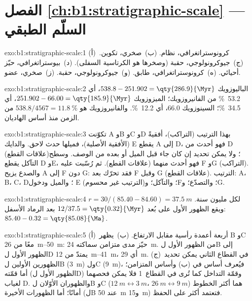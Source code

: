 \section*{الفصل \ref{ch:b1:stratigraphic-scale} --- السلّم الطبقي}

\begin{solution}{exo:b1:stratigraphic-scale:1}
(أ)~كرونوستراتغرافي، نظام. (ب)~صخري، تكوين.
(ج)~جيوكرونولوجي، حقبة (وصخرها هو  الكرتاسية السفلى).
(د)~بيوستراتغرافي، حيّز أحيائي. (ه)~كرونوستراتغرافي، طابق.
(و)~جيوكرونولوجي، حقبة. (ز)~صخري، عضو.
\end{solution}

\begin{solution}{exo:b1:stratigraphic-scale:2}
الباليوزويك $538.8 - 251.902 = \qty{286.9}{\Myr}$، أي \qty{53.2}{\%} من الفانيروزويك؛ الميزوزويك $251.902 - 66.00 = \qty{185.9}{\Myr}$، أي \qty{34.5}{\%}؛ السينوزويك \qty{66.0}{\Myr}، أي \qty{12.2}{\%}. والفانيروزويك هو $538.8/4567 = \qty{11.8}{\%}$ من الزمن منذ أساس الهاديان.
\end{solution}

\begin{solution}{exo:b1:stratigraphic-scale:3}
تكوّنت A وB وC وD بهذا الترتيب (التراكب)، أفقيةً (الأفقية الأصلية)، فميلها حدث لاحق. والدايك E يقطع A إلى D، فهو أحدث من D (علاقات القطع)؛ ولا يمكن تحديد إن كان جاء قبل الميل أو بعده من الوصف. وسطح التآكل يقطع D وE، فهو أحدث منهما (علاقات القطع). ثم رُسّبت عليه F وG (التراكب). والصدع يزيح A إلى F دون G: فقد تحرّك بعد F وقبل G (علاقات القطع). الترتيب: A، B، C، D؛ والميل ودخول E (الترتيب غير محسوم)؛ والتآكل؛ وF؛ والتصدّع؛ وG.
\end{solution}

\begin{solution}{exo:b1:stratigraphic-scale:4}
$r = 30/(85.40 - 84.60) = \qty{37.5}{m}$ لكل مليون سنة. ويقع الظهور الأول على بُعد $12/37.5 = \qty{0.32}{\Myr}$ بعد الرماد الأسفل: $85.40 - 0.32 =
\qty{85.08}{\Ma}$.
\end{solution}

\begin{solution}{exo:b1:stratigraphic-scale:5}
(أ)~أربعة أعمدة رأسية مقابل الارتفاع. (ب)~يظهر B وC معًا من \qtyrange{26}{50}{m}: حيّز مدى متزامن سماكته \qty{24}{m}.  من الظهور الأول لB إلى الظهور الأول لD يمتدّ من \qtyrange{12}{41}{m}، أي \qty{29}{m}. (ج)~في القطاع الثاني يمكن تحديد الظهورين الأولين لB (\qty{3}{m}) ولC (\qty{9}{m})، فيُعرف أساس  في (ب) وأساس  المتزامن؛ أما قمّته (الظهور الأول لD) وقمّة التداخل كما تُرى في القطاع~1 فلا يمكن فحصهما لغياب D. والظهوران الأوّلان لB وC ($\qty{12}{m} \leftrightarrow
\qty{3}{m}$، $\qty{26}{m} \leftrightarrow \qty{9}{m}$) هما أكثر الخطوط أمانًا؛ أما الظهورات الأخيرة (لB عند \qty{50}{m} و\qty{15}{m}) فتعتمد أكثر على الحفظ.
\end{solution}

